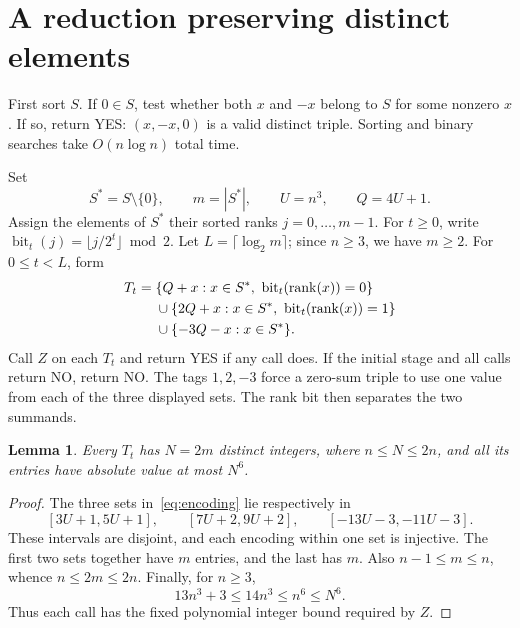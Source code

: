 \documentclass[11pt]{article}
\newtheorem{lemma}{Lemma}
\newcommand{\bits}{\operatorname{bit}}
\begin{document}
\section{A reduction preserving distinct elements}\label{sec:reduction}

First sort $S$. If $0\in S$, test whether both $x$ and $-x$ belong to
$S$ for some nonzero $x$. If so, return YES:
$(x,-x,0)$ is a valid distinct triple.
Sorting and binary searches take $O(n\log n)$ total time.

Set
\[
 S^*=S\setminus\{0\},\qquad m=|S^*|,\qquad U=n^3,\qquad Q=4U+1.
\]
Assign the elements of $S^*$ their sorted ranks
$j=0,\ldots,m-1$. For $t\geq0$, write
$\bits_t(j)=\lfloor j/2^t\rfloor\bmod2$.
Let $L=\lceil\log_2m\rceil$; since $n\geq3$, we have $m\geq2$.
For $0\leq t<L$, form
\begin{align}
 T_t={}&
 \{Q+x:x\in S^*,\ \bits_t(\operatorname{rank}(x))=0\}\notag\\
 &{}\cup
 \{2Q+x:x\in S^*,\ \bits_t(\operatorname{rank}(x))=1\}\notag\\
 &{}\cup\{-3Q-x:x\in S^*\}.\label{eq:encoding}
\end{align}
Call $Z$ on each $T_t$ and return YES if any call does.
If the initial stage and all calls return NO, return NO.
The tags $1,2,-3$ force a zero-sum triple to use one value from each
of the three displayed sets. The rank bit then separates the two summands.

\begin{lemma}\label{lem:legal}
Every $T_t$ has $N=2m$ distinct integers, where $n\leq N\leq2n$,
and all its entries have absolute value at most $N^6$.
\end{lemma}
\begin{proof}
The three sets in~\eqref{eq:encoding} lie respectively in
\[
 [3U+1,5U+1],\qquad [7U+2,9U+2],\qquad
 [-13U-3,-11U-3].
\]
These intervals are disjoint, and each encoding within one set is
injective. The first two sets together have $m$ entries, and the
last has $m$. Also $n-1\leq m\leq n$, whence $n\leq2m\leq2n$.
Finally, for $n\geq3$,
\[
 13n^3+3\leq14n^3\leq n^6\leq N^6.
\]
Thus each call has the fixed polynomial integer bound required by $Z$.
\end{proof}
\end{document}
